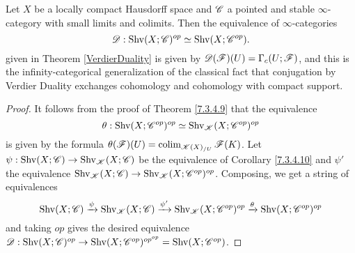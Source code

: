 \documentclass[../thesis.tex]{subfiles}
\begin{document}
\begin{proposition}[{\cite[Proposition 5.5.5.10]{HA}}]
    Let $X$ be a locally compact Hausdorff space and $\mathscr{C}$ a pointed and stable $\infty$-category with small limits and colimits.
    Then the equivalence of $\infty$-categories
    \[
        \mathscr{D} : \mathrm{Shv}(X;\mathscr{C})^{op} \simeq \mathrm{Shv}(X;\mathscr{C}^{op}).
    \]
    given in Theorem \ref{VerdierDuality} is given by $\mathscr{D}(\mathscr{F})(U) = \Gamma_c(U;\mathscr{F})$, and this is the infinity-categorical generalization of the classical fact that conjugation by Verdier Duality exchanges cohomology and cohomology with compact support.
\end{proposition}
\begin{proof}
    It follows from the proof of Theorem \ref{7.3.4.9} that the equivalence
    \[
        \theta: \mathrm{Shv}(X;\mathscr{C}^{op})^{op} \simeq \mathrm{Shv}_{\mathscr{K}}(X;\mathscr{C}^{op})^{op}
    \]
    is given by the formula $\theta(\mathscr{F})(U) = \operatorname{colim}_{\mathscr{K}(X)_{/U}}\mathscr{F}(K)$.
    Let $\psi: \mathrm{Shv}(X;\mathscr{C}) \to \mathrm{Shv}_{\mathscr{K}}(X;\mathscr{C})$ be the equivalence of Corollary \ref{7.3.4.10} and $\psi'$ the equivalence $\mathrm{Shv}_{\mathscr{K}}(X;\mathscr{C}) \to \mathrm{Shv}_{\mathscr{K}}(X;\mathscr{C}^{op})^{op}$.
    Composing, we get a string of equivalences
    \[
        \mathrm{Shv}(X;\mathscr{C}) \xrightarrow{\psi} \mathrm{Shv}_{\mathscr{K}}(X;\mathscr{C}) \xrightarrow{\psi'} \mathrm{Shv}_{\mathscr{K}}(X;\mathscr{C}^{op})^{op} \xrightarrow{\theta} \mathrm{Shv}(X;\mathscr{C}^{op})^{op}
    \]
    and taking $op$ gives the desired equivalence $\mathscr{D}:\mathrm{Shv}(X;\mathscr{C})^{op}\to \mathrm{Shv}(X;\mathscr{C}^{op})^{{op}^{op}}=\mathrm{Shv}(X;\mathscr{C}^{op})$.

\end{proof}
\end{document}

